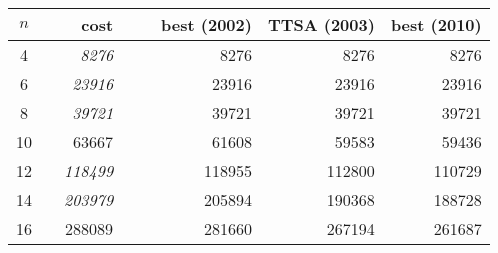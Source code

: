 

 \begin{tabular}{c r r r r r r r }\toprule
 $n$ && cost  & && best (2002) &  TTSA (2003) &best (2010)  \\\midrule
 4   && \emph{8276}  & && 8276            &	8276 &8276  \\
 6   && \emph{23916} & && 	23916     &  23916 &23916 \\
 8   && \emph{39721} & &&	  39721   &  39721 &39721  \\
 10  &&  63667     && & 	61608	& 59583 &59436 \\
 12  &&  \emph{118499}     && &	118955	 &112800 &110729 \\
 14  &&   \emph{203979}    && & 205894		&190368 &188728 \\
 16  && 288089   && &       281660          &267194 &261687 \\
 \bottomrule
 
 \end{tabular}

